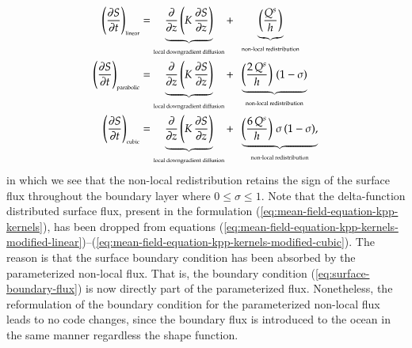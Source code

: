 \begin{subequations}
\begin{align}
 \left( \frac{\partial S}{\partial t} \right)_{\mbox{\tiny linear}} &= 
 \underbrace{
 \frac{\partial}{\partial z} \left( K \, \frac{\partial S}{\partial z} \right)
  }_{\mbox{\tiny local downgradient diffusion}}
 + \; \; \underbrace{
  \left( \frac{Q^{s}}{h} \right)
  }_{\mbox{\tiny non-local redistribution}} 
\label{eq:mean-field-equation-kpp-kernels-modified-linear}
\\
 \left( \frac{\partial S}{\partial t} \right)_{\mbox{\tiny parabolic}} &= 
 \underbrace{
 \frac{\partial}{\partial z} \left( K \, \frac{\partial S}{\partial z} \right)
  }_{\mbox{\tiny local downgradient diffusion}}
 + \; \; \underbrace{
  \left( \frac{2 \, Q^{s}}{h} \right)  \, (1-\sigma)
  }_{\mbox{\tiny non-local redistribution}} 
\label{eq:mean-field-equation-kpp-kernels-modified-parabolic}
\\
 \left( \frac{\partial S}{\partial t} \right)_{\mbox{\tiny cubic}} &= 
 \underbrace{
 \frac{\partial}{\partial z} \left( K \, \frac{\partial S}{\partial z} \right)
  }_{\mbox{\tiny local downgradient diffusion}}
 + \; \; \underbrace{
  \left( \frac{6 \, Q^{s}}{h} \right)  \, \sigma \, (1-\sigma),
  }_{\mbox{\tiny non-local redistribution}} 
\label{eq:mean-field-equation-kpp-kernels-modified-cubic}
\end{align}
\end{subequations}
in which we see that the non-local redistribution retains the sign of
the surface flux throughout the boundary layer where $0 \le \sigma \le
1$.  Note that the delta-function distributed surface flux, present in
the formulation (\ref{eq:mean-field-equation-kpp-kernels}), has been
dropped from equations
(\ref{eq:mean-field-equation-kpp-kernels-modified-linear})--(\ref{eq:mean-field-equation-kpp-kernels-modified-cubic}).
The reason is that the surface boundary condition has been absorbed by
the parameterized non-local flux.  That is, the boundary condition
(\ref{eq:surface-boundary-flux}) is now directly part of the
parameterized flux.  Nonetheless, the reformulation of the boundary
condition for the parameterized non-local flux leads to no code
changes, since the boundary flux is introduced to the ocean in the
same manner regardless the shape function.



